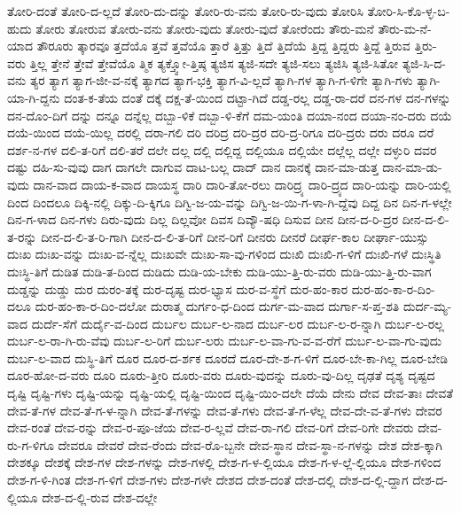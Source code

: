 {ತೋರಿ-ದಂತೆ
ತೋರಿ-ದ-ಲ್ಲದೆ
ತೋರಿ-ದು-ದನ್ನು
ತೋರಿ-ರು-ವನು
ತೋರಿ-ರು-ವುದು
ತೋರಿಸಿ
ತೋರಿ-ಸಿ-ಕೊ-ಳ್ಳ-ಬ-ಹುದು
ತೋರು
ತೋರುವ
ತೋರು-ವನು
ತೋರು-ವುದು
ತೋರು-ವುದೆ
ತೋರೆಂದು
ತೌರು-ಮನೆ
ತೌರು-ಮ-ನೆ-ಯಾದ
ತೌರೂರು
ತ್ಕಾರವೂ
ತ್ತದೆಯೊ
ತ್ತವೆ
ತ್ತವೆಯೊ
ತ್ತಾರೆ
ತ್ತಿತ್ತು
ತ್ತಿದೆ
ತ್ತಿದೆಯೆ
ತ್ತಿದ್ದ
ತ್ತಿದ್ದರು
ತ್ತಿದ್ದೆ
ತ್ತಿರುವ
ತ್ತಿರು-ವರು
ತ್ತಿಲ್ಲ
ತ್ತೇನೆ
ತ್ತೇವೆ
ತ್ತೇವೆಯೊ
ತ್ಮಿಕ
ತ್ಯಕ್ತ್ವೋ-ತ್ತಿಷ್ಠ
ತ್ಯಜಿಸ
ತ್ಯಜಿ-ಸದೇ
ತ್ಯಜಿ-ಸಲು
ತ್ಯಜಿಸಿ
ತ್ಯಜಿ-ಸಿತೋ
ತ್ಯಜಿ-ಸಿ-ದ-ವನು
ತ್ಯರ
ತ್ಯಾಗ
ತ್ಯಾಗ-ಜೀ-ವ-ನಕ್ಕೆ
ತ್ಯಾಗದ
ತ್ಯಾಗ-ಭಕ್ತಿ
ತ್ಯಾಗ-ವಿ-ಲ್ಲದೆ
ತ್ಯಾಗಿ-ಗಳ
ತ್ಯಾಗಿ-ಗ-ಳಿಗೇ
ತ್ಯಾಗಿ-ಗಳು
ತ್ಯಾಗಿ-ಯಾ-ಗಿ-ದ್ದನು
ದಂತ-ಕ-ತೆಯ
ದಂತೆ
ದಕ್ಕೆ
ದಕ್ಷ-ತೆ-ಯಿಂದ
ದಟ್ಟಾ-ಗಿದೆ
ದಡ್ಡ-ರಲ್ಲ
ದಡ್ಡ-ರಾ-ದರೆ
ದನ-ಗಳ
ದನ-ಗಳನ್ನು
ದನ-ದೊಂ-ದಿಗೆ
ದನ್ನು
ದನ್ನೂ
ದನ್ನೆಲ್ಲ
ದಬ್ಬಾ-ಳಿಕೆ
ದಬ್ಬಾ-ಳಿ-ಕೆಗೆ
ದಮ-ಯಂತಿ
ದಯಾ-ನಂದ
ದಯಾ-ನಂ-ದರು
ದಯೆ
ದಯೆ-ಯಿಂದ
ದಯೆ-ಯಿಲ್ಲ
ದರಲ್ಲಿ
ದರಾ-ಗಲಿ
ದರಿ
ದರಿದ್ರ
ದರಿ-ದ್ರರ
ದರಿ-ದ್ರ-ರಿಗೂ
ದರಿ-ದ್ರರು
ದರು
ದರೂ
ದರೆ
ದರ್ಶ-ನ-ಗಳ
ದಲಿ-ತ-ರಿಗೆ
ದಲಿ-ತರೆ
ದಲೇ
ದಲ್ಲ
ದಲ್ಲಿ
ದಲ್ಲಿದ್ದ
ದಲ್ಲಿಯೂ
ದಲ್ಲಿಯೇ
ದಲ್ಲೆಲ್ಲ
ದಲ್ಲೇ
ದಳ್ಳುರಿ
ದವರ
ದಷ್ಟು
ದಹಿ-ಸು-ವುವು
ದಾಗ
ದಾಗಲೇ
ದಾಗುವ
ದಾಟ-ಬಲ್ಲ
ದಾದ್
ದಾನ
ದಾನಕ್ಕೆ
ದಾನ-ಮಾ-ಡುತ್ತ
ದಾನ-ಮಾ-ಡು-ವುದು
ದಾನ-ವಾದ
ದಾಯ-ಕ-ವಾದ
ದಾಯಸ್ಥ
ದಾರಿ
ದಾರಿ-ತೋ-ರಲು
ದಾರಿದ್ರ್ಯ
ದಾರಿ-ದ್ರ್ಯದ
ದಾರಿ-ಯನ್ನು
ದಾರಿ-ಯಲ್ಲಿ
ದಿಂದ
ದಿಂದಲೂ
ದಿಕ್ಕಿ-ನಲ್ಲಿ
ದಿಕ್ಕು-ದಿ-ಕ್ಕಿಗೂ
ದಿಗ್ವಿ-ಜ-ಯ-ವನ್ನು
ದಿಗ್ವಿ-ಜ-ಯಿ-ಗ-ಳಾ-ಗಿ-ದ್ದೆವು
ದಿದ್ದ
ದಿನ
ದಿನ-ಗ-ಳಲ್ಲೇ
ದಿನ-ಗ-ಳಾದ
ದಿನ-ಗಳು
ದಿರು-ವುದು
ದಿಲ್ಲ
ದಿಲ್ಲವೋ
ದಿವಸ
ದಿವ್ಯೌ-ಷಧಿ
ದಿಸುವ
ದೀನ
ದೀನ-ದ-ರಿ-ದ್ರರ
ದೀನ-ದ-ಲಿ-ತ-ರನ್ನು
ದೀನ-ದ-ಲಿ-ತ-ರಿ-ಗಾಗಿ
ದೀನ-ದ-ಲಿ-ತ-ರಿಗೆ
ದೀನ-ರಿಗೆ
ದೀನರು
ದೀನರೆ
ದೀರ್ಘ-ಕಾಲ
ದೀರ್ಘಾ-ಯುಸ್ಸು
ದುಃಖ
ದುಃಖ-ವನ್ನು
ದುಃಖ-ವ-ನ್ನೆಲ್ಲ
ದುಃಖವೇ
ದುಃಖ-ಸಾ-ವು-ಗಳಿಂದ
ದುಃಖಿ
ದುಃಖಿ-ಗ-ಳಿಗೆ
ದುಃಖಿ-ಗಳೆ
ದುಃಸ್ಥಿತಿ
ದುಃಸ್ಥಿ-ತಿಗೆ
ದುಡಿತ
ದುಡಿ-ತ-ದಿಂದ
ದುಡಿದು
ದುಡಿ-ಯ-ಬೇಕು
ದುಡಿ-ಯು-ತ್ತಿ-ರು-ವರು
ದುಡಿ-ಯು-ತ್ತಿ-ರು-ವಾಗ
ದುಡ್ಡನ್ನು
ದುಡ್ಡು
ದುರ
ದುರಂ-ತಕ್ಕೆ
ದುರ-ದೃಷ್ಟ
ದುರ-ಭ್ಯಾಸ
ದುರ-ವ-ಸ್ಥೆಗೆ
ದುರ-ಹಂ-ಕಾರ
ದುರ-ಹಂ-ಕಾ-ರ-ದಿಂ-ದಲೂ
ದುರ-ಹಂ-ಕಾ-ರ-ದಿಂ-ದಲೋ
ದುರಾತ್ಮ
ದುರ್ಗಂ-ಧ-ದಿಂದ
ದುರ್ಗ-ಮ-ವಾದ
ದುರ್ಗಾ-ಸ-ಪ್ತ-ಶತಿ
ದುರ್ದ-ಮ್ಯ-ವಾದ
ದುರ್ದೆ-ಸೆಗೆ
ದುರ್ದೈ-ವ-ದಿಂದ
ದುರ್ಬಲ
ದುರ್ಬ-ಲ-ನಾದ
ದುರ್ಬ-ಲರ
ದುರ್ಬ-ಲ-ರ-ನ್ನಾಗಿ
ದುರ್ಬ-ಲ-ರಲ್ಲ
ದುರ್ಬ-ಲ-ರಾ-ಗಿ-ರು-ವೆವು
ದುರ್ಬ-ಲ-ರಿಗೆ
ದುರ್ಬ-ಲರು
ದುರ್ಬ-ಲ-ವಾ-ಗು-ವ-ವ-ರೆಗೆ
ದುರ್ಬ-ಲ-ವಾ-ಗು-ವುದು
ದುರ್ಬ-ಲ-ವಾದ
ದುಸ್ಥಿ-ತಿಗೆ
ದೂರ
ದೂರ-ದ-ರ್ಶಕ
ದೂರದೆ
ದೂರ-ದೇ-ಶ-ಗ-ಳಿಗೆ
ದೂರ-ಬೇ-ಕಾ-ಗಿಲ್ಲ
ದೂರ-ಬೇಡಿ
ದೂರ-ಹೋ-ದ-ವರು
ದೂರಿ
ದೂರು-ತ್ತೀರಿ
ದೂರು-ವರು
ದೂರು-ವುದನ್ನು
ದೂರು-ವು-ದಿಲ್ಲ
ದೃಢತೆ
ದೃಶ್ಯ
ದೃಷ್ಟದ
ದೃಷ್ಟಿ
ದೃಷ್ಟಿ-ಗಳು
ದೃಷ್ಟಿ-ಯನ್ನು
ದೃಷ್ಟಿ-ಯಲ್ಲಿ
ದೃಷ್ಟಿ-ಯಿಂದ
ದೃಷ್ಟಿ-ಯಿಂ-ದಲೇ
ದೆಯೆ
ದೇನು
ದೇವ
ದೇವ-ತಾಃ
ದೇವತೆ
ದೇವ-ತೆ-ಗಳ
ದೇವ-ತೆ-ಗ-ಳ-ನ್ನಾಗಿ
ದೇವ-ತೆ-ಗಳನ್ನು
ದೇವ-ತೆ-ಗಳು
ದೇವ-ತೆ-ಗ-ಳೆಲ್ಲ
ದೇವ-ದೇ-ವ-ತೆ-ಗಳು
ದೇವರ
ದೇವ-ರಂತೆ
ದೇವ-ರನ್ನು
ದೇವ-ರ-ಪೂ-ಜೆಯ
ದೇವ-ರ-ಲ್ಲವೆ
ದೇವ-ರಾ-ಗಲಿ
ದೇವ-ರಿಗೆ
ದೇವ-ರಿಗೇ
ದೇವರು
ದೇವ-ರು-ಗ-ಳಿಗೂ
ದೇವರೂ
ದೇವರೆ
ದೇವ-ರೆಂದು
ದೇವ-ರೊ-ಬ್ಬನೇ
ದೇವ-ಸ್ಥಾನ
ದೇವ-ಸ್ಥಾ-ನ-ಗಳನ್ನು
ದೇಶ
ದೇಶ-ಕ್ಕಾಗಿ
ದೇಶಕ್ಕೂ
ದೇಶಕ್ಕೆ
ದೇಶ-ಗಳ
ದೇಶ-ಗಳನ್ನು
ದೇಶ-ಗಳಲ್ಲಿ
ದೇಶ-ಗ-ಳ-ಲ್ಲಿಯೂ
ದೇಶ-ಗ-ಳ-ಲ್ಲೆ-ಲ್ಲಿಯೂ
ದೇಶ-ಗಳಿಂದ
ದೇಶ-ಗ-ಳಿ-ಗಿಂತ
ದೇಶ-ಗ-ಳಿಗೆ
ದೇಶ-ಗಳು
ದೇಶ-ಗಳೇ
ದೇಶದ
ದೇಶ-ದಂತೆ
ದೇಶ-ದಲ್ಲಿ
ದೇಶ-ದ-ಲ್ಲಿ-ದ್ದಾಗ
ದೇಶ-ದ-ಲ್ಲಿಯೂ
ದೇಶ-ದ-ಲ್ಲಿ-ರುವ
ದೇಶ-ದಲ್ಲೇ
}
